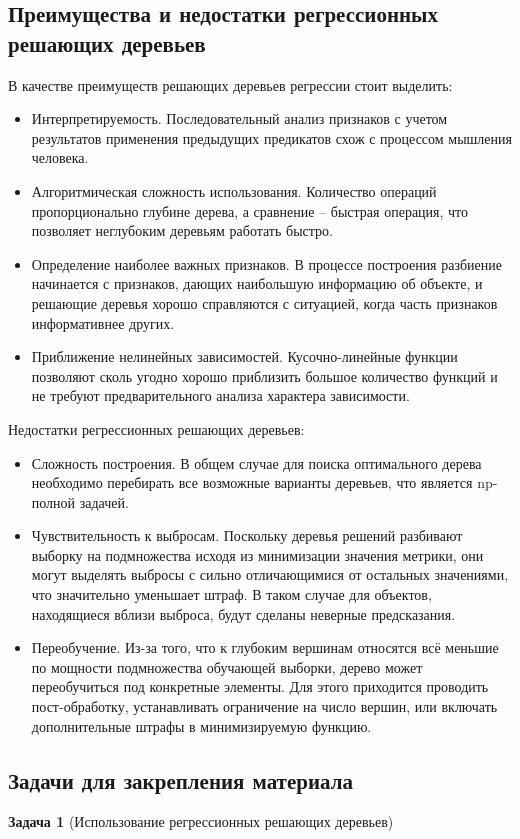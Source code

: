 \subsection{Преимущества и недостатки регрессионных решающих деревьев}

В качестве преимуществ решающих деревьев регрессии стоит выделить:
\begin{itemize}
    \item Интерпретируемость. Последовательный анализ признаков с учетом результатов применения предыдущих предикатов схож с процессом мышления человека.
    \item Алгоритмическая сложность использования. Количество операций пропорционально глубине дерева, а сравнение -- быстрая операция, что позволяет неглубоким деревьям работать быстро.
    \item Определение наиболее важных признаков. В процессе построения разбиение начинается с признаков, дающих наибольшую информацию об объекте, и решающие деревья хорошо справляются с ситуацией, когда часть признаков информативнее других.
    \item Приближение нелинейных зависимостей. Кусочно-линейные функции позволяют сколь угодно хорошо приблизить большое количество функций и не требуют предварительного анализа характера зависимости.
\end{itemize}

Недостатки регрессионных решающих деревьев:
\begin{itemize}
    \item Сложность построения. В общем случае для поиска оптимального дерева необходимо перебирать все возможные варианты деревьев, что является np-полной задачей.
    \item Чувствительность к выбросам. Поскольку деревья решений разбивают выборку на подмножества исходя из минимизации значения метрики, они могут выделять выбросы с сильно отличающимися от остальных значениями, что значительно уменьшает штраф. В таком случае для объектов, находящиеся вблизи выброса, будут сделаны неверные предсказания.
    \item Переобучение. Из-за того, что к глубоким вершинам относятся всё меньшие по мощности подмножества обучающей выборки, дерево может переобучиться под конкретные элементы. Для этого приходится проводить пост-обработку, устанавливать ограничение на число вершин, или включать дополнительные штрафы в минимизируемую функцию.
\end{itemize}

\subsection{Задачи для закрепления материала}
\textbf{Задача 1} (Использование регрессионных решающих деревьев)

